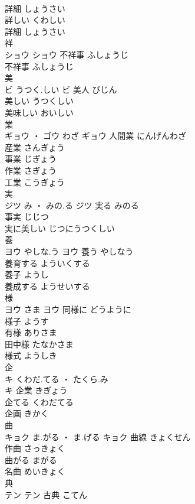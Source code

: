 \documentclass[8pt]{extreport}
\begin{document}
\begin{CJK}{UTF8}{min}
\\	詳細	しょうさい	
\\	詳しい	くわしい	
\\	詳細	しょうさい	
\\	祥	
\\	ショウ		ショウ	不祥事	ふしょうじ	
\\	不祥事	ふしょうじ	
\\	美	
\\	ビ	うつく.しい	ビ	美人	びじん	
\\	美しい	うつくしい	
\\	美味しい	おいしい	
\\	業	
\\	ギョウ ・ ゴウ	わざ	ギョウ	人間業	にんげんわざ	
\\	産業	さんぎょう	
\\	事業	じぎょう	
\\	作業	さぎょう	
\\	工業	こうぎょう	
\\	実	
\\	ジツ	み ・ みの.る	ジツ	実る	みのる	
\\	事実	じじつ	
\\	実に美しい	じつにうつくしい	
\\	養	
\\	ヨウ	やしな.う	ヨウ	養う	やしなう	
\\	養育する	よういくする	
\\	養子	ようし	
\\	養成する	ようせいする	
\\	様	
\\	ヨウ	さま	ヨウ	同様に	どうように	
\\	様子	ようす	
\\	有様	ありさま	
\\	田中様	たなかさま	
\\	様式	ようしき	
\\	企	
\\	キ	くわだ.てる ・ たくら.み
\\	キ	企業	きぎょう	
\\	企てる	くわだてる	
\\	企画	きかく	
\\	曲	
\\	キョク	ま.がる ・ ま.げる	キョク	曲線	きょくせん	
\\	作曲	さっきょく	
\\	曲がる	まがる	
\\	名曲	めいきょく	
\\	典	
\\	テン		テン	古典	こてん	

\end{CJK}
\end{document}
